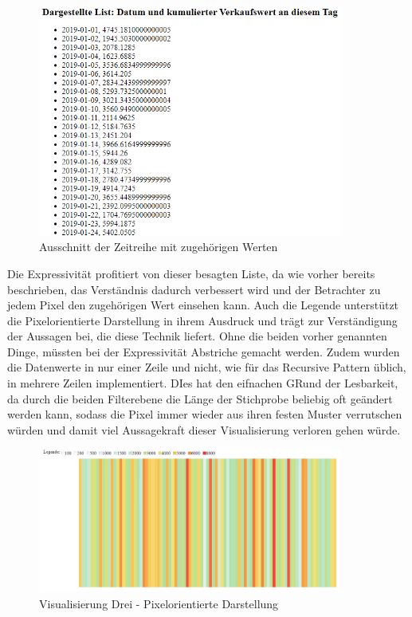 \documentclass[usegeometry=true]{scrartcl}
\begin{document}
\begin{figure} [H]
	\begin{center}
		\includegraphics[width=10cm]{IMG/Zeitreihe}
		\caption{Ausschnitt der Zeitreihe mit zugehörigen Werten}
		\label{fig:Zeitreihe}
	\end{center}
\end{figure}

\noindent Die Expressivität profitiert von dieser besagten Liste, da wie vorher bereits beschrieben, das Verständnis dadurch verbessert wird und der Betrachter zu jedem Pixel den zugehörigen
Wert einsehen kann. Auch die Legende unterstützt die Pixelorientierte Darstellung in ihrem Ausdruck und trägt zur Verständigung der Aussagen bei, die diese Technik liefert. Ohne
die beiden vorher genannten Dinge, müssten bei der Expressivität Abstriche gemacht werden. Zudem wurden die Datenwerte in nur einer Zeile und nicht, wie für das Recursive
Pattern üblich, in mehrere Zeilen implementiert. DIes hat den eifnachen GRund der Lesbarkeit, da durch die beiden Filterebene die Länge der Stichprobe beliebig oft geändert werden
kann, sodass die Pixel immer wieder aus ihren festen Muster verrutschen würden und damit viel Aussagekraft dieser Visualisierung verloren gehen würde. \\

\begin{figure} [H]
	\begin{center}
		\includegraphics[width=10cm]{IMG/RecursivePattern.png}
		\caption{Visualisierung Drei - Pixelorientierte Darstellung}
		\label{fig:RecursivePattern}
	\end{center}
\end{figure}
\end{document}

